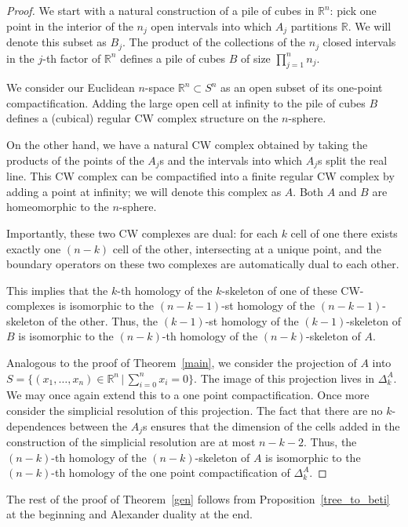 \documentclass{amsart}
\newcommand{\R}{{\mathbb R}}
\begin{document}
\begin{proof}
  We start with a natural construction of a pile of cubes in $\R^n$: pick one point in the interior of the $n_j$ open intervals
  into which $A_j$ partitions $\R$. We will denote this subset as $B_j$. The product of the collections of the $n_j$ closed
  intervals in the $j$-th factor of $\R^n$ defines a pile of cubes $B$ of size $\prod_{j=1}^n n_j$.

  We consider our Euclidean
  $n$-space $\R^n\subset S^n$ as an open subset of its one-point compactification. Adding the large open cell at infinity to
  the pile of cubes $B$ defines a (cubical) regular CW complex structure on the $n$-sphere.

  On the other hand, we have a natural CW complex obtained by taking the products of the points of the $A_j$s
  and the intervals into which $A_j$s split the real line. This CW complex can be compactified into a
  finite regular CW complex by adding a point at infinity; we will denote this complex as $A$.
  Both $A$ and $B$ are homeomorphic to the $n$-sphere.

  Importantly, these two CW complexes are dual: for each $k$ cell of one there exists exactly one $(n-k)$ cell
  of the other, intersecting  at a unique point, and the boundary operators on these two complexes are automatically dual to each other.

  This implies that the $k$-th homology of the $k$-skeleton of one of these CW-complexes is isomorphic to the $(n-k-1)$-st homology of the $(n-k-1)$-skeleton of the other. Thus, the $(k-1)$-st homology of the $(k-1)$-skeleton of $B$ is isomorphic to the $(n-k)$-th homology of the $(n-k)$-skeleton of $A$.
  
  Analogous to the proof of Theorem~\ref{main}, we consider the projection of $A$ into $S = \{(x_1, \ldots, x_n) \in \R^n \, | \, \sum_{i=0}^n x_i = 0\}$. The image of this projection lives in $\Delta^A_{k}$. We may once again extend this to a one point compactification. Once more consider the simplicial resolution of this projection. The fact that there are no $k$-dependences between the $A_j$s ensures that the dimension of the cells added in the construction of the simplicial resolution are at most $n-k-2$. Thus, the $(n-k)$-th homology of the $(n-k)$-skeleton of $A$ is isomorphic to the $(n-k)$-th homology of the one point compactification of $\Delta^A_{k}$.
\end{proof}

The rest of the proof of Theorem~\ref{gen} follows from Proposition~\ref{tree_to_beti} at the beginning and Alexander duality at the end.
\end{document}
